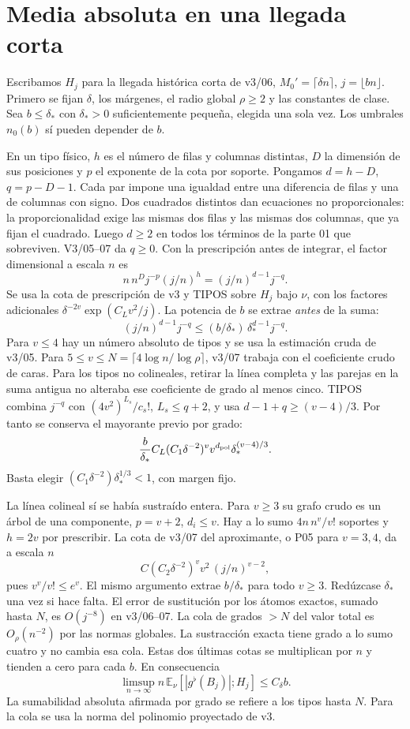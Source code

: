 \section*{Media absoluta en una llegada corta}
Escribamos \(H_j\) para la llegada histórica corta de v3/06,
\(M_0'=\lceil\delta n\rceil\), \(j=\lfloor bn\rfloor\).
Primero se fijan \(\delta\), los márgenes, el radio global \(\rho\ge2\) y las
constantes de clase. Sea \(b\le\delta_*\) con \(\delta_*>0\) suficientemente pequeña,
elegida una sola vez. Los umbrales \(n_0(b)\) sí pueden depender de \(b\).

En un tipo físico, \(h\) es el número de filas y columnas distintas, \(D\) la
dimensión de sus posiciones y \(p\) el exponente de la cota por soporte.
Pongamos \(d=h-D\), \(q=p-D-1\). Cada par impone una igualdad entre una
diferencia de filas y una de columnas con signo. Dos cuadrados distintos dan
ecuaciones no proporcionales: la proporcionalidad exige las mismas dos filas
y las mismas dos columnas, que ya fijan el cuadrado. Luego \(d\ge2\) en
todos los términos de la parte 01 que sobreviven. V3/05--07 da \(q\ge0\).
Con la prescripción antes de integrar, el factor dimensional a escala \(n\) es
\[
 n\, n^D j^{-p}(j/n)^h=(j/n)^{d-1}j^{-q}.
\]
Se usa la cota de prescripción de v3 y TIPOS sobre \(H_j\) bajo \(\nu\),
con los factores adicionales \(\delta^{-2v}\exp(C_Lv^2/j)\).
La potencia de \(b\) se extrae \emph{antes} de la suma:
\[
 (j/n)^{d-1}j^{-q}
 \le (b/\delta_*)\,\delta_*^{d-1} j^{-q}.
\]
Para \(v\le4\) hay un número absoluto de tipos y se usa la estimación cruda de v3/05.
Para \(5\le v\le N=\lceil4\log n/\log\rho\rceil\), v3/07 trabaja con el
coeficiente crudo de caras. Para los tipos no colineales, retirar la línea completa
y las parejas en la suma antigua no alteraba ese coeficiente de grado al menos cinco.
TIPOS combina \(j^{-q}\) con \((4v^2)^{L_s}/c_s!\), \(L_s\le q+2\), y usa
\(d-1+q\ge(v-4)/3\). Por tanto se conserva el mayorante previo por grado:
\[
 \frac b{\delta_*} C_L(C_1\delta^{-2})^v v^{d_{\rm pol}}\delta_*^{(v-4)/3}.
\]
Basta elegir \((C_1\delta^{-2})\delta_*^{1/3}<1\), con margen fijo.

La línea colineal sí se había sustraído entera. Para \(v\ge3\) su grafo crudo
es un árbol de una componente, \(p=v+2\), \(d_i\le v\).
Hay a lo sumo \(4n\, n^v/v!\) soportes y \(h=2v\) por prescribir.
La cota de v3/07 del aproximante, o P05 para \(v=3,4\), da a escala \(n\)
\[
 C(C_2\delta^{-2})^v v^2\, (j/n)^{v-2},
\]
pues \(v^v/v!\le e^v\). El mismo argumento extrae \(b/\delta_*\) para todo \(v\ge3\).
Redúzcase \(\delta_*\) una vez si hace falta. El error de sustitución por los
átomos exactos, sumado hasta \(N\), es \(O(j^{-8})\) en v3/06--07.
La cola de grados \(>N\) del valor total es \(O_\rho(n^{-2})\) por las normas
globales. La sustracción exacta tiene grado a lo sumo cuatro y no cambia esa cola.
Estas dos últimas cotas se multiplican por \(n\) y tienden a cero para cada \(b\).
En consecuencia
\[
 \limsup_{n\to\infty} n\,\mathbb E_\nu[|g^\flat(B_j)|;H_j]\le C_\delta b .
\]
La sumabilidad absoluta afirmada por grado se refiere a los tipos hasta \(N\).
Para la cola se usa la norma del polinomio proyectado de v3.
